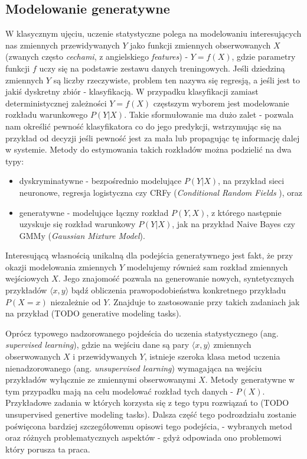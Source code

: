 \documentclass[magisterska]{pracamgr}
\begin{document}
\subsection{Modelowanie generatywne}

W klasycznym ujęciu, uczenie statystyczne polega na modelowaniu interesujących nas zmiennych przewidywanych $Y$ jako funkcji zmiennych obserwowanych $X$ (zwanych często \textit{cechami}, z angielskiego \textit{features}) - $Y = f(X)$, gdzie parametry funkcji $f$ uczy się na podstawie zestawu danych treningowych. Jeśli dziedziną zmiennych $Y$ są liczby rzeczywiste, problem ten nazywa się regresją, a jeśli jest to jakiś dyskretny zbiór - klasyfikacją. W przypadku klasyfikacji zamiast deterministycznej zależności $Y = f(X)$ częstszym wyborem jest modelowanie rozkładu warunkowego $P(Y|X)$. Takie sformułowanie ma dużo zalet - pozwala nam określić pewność klasyfikatora co do jego predykcji, wstrzymując się na przykład od decyzji jeśli pewność jest za mała lub propagując tę informację dalej w systemie. Metody do estymowania takich rozkładów można podzielić na dwa typy:
\begin{itemize}
    \setlength\itemsep{0em}
    \item dyskryminatywne - bezpośrednio modelujące $P(Y|X)$, na przykład sieci neuronowe, regresja logistyczna czy CRFy (\textit{Conditional Random Fields} \cite{Lafferty2001ConditionalRF}), oraz
    \item generatywne - modelujące łączny rozkład $P(Y, X)$, z którego następnie uzyskuje się rozkład warunkowy $P(Y|X)$, jak na przykład Naive Bayes czy GMMy (\textit{Gaussian Mixture Model}).
\end{itemize}
Interesującą własnością unikalną dla podejścia generatywnego jest fakt, że przy okazji modelowania zmiennych $Y$ modelujemy również sam rozkład zmiennych wejściowych $X$. Jego znajomość pozwala na generowanie nowych, syntetycznych przykładów $\langle x, y \rangle$ bądź obliczenia prawopodobieństwa konkretnego przykładu $P(X = x)$ niezależnie od $Y$. Znajduje to zastosowanie przy takich zadaniach jak na przykład (TODO generative modeling tasks).

Oprócz typowego nadzorowanego pojdeścia do uczenia statystycznego (ang. \textit{supervised learning}), gdzie na wejściu dane są pary $\langle x, y \rangle$ zmiennych obserwowanych $X$ i przewidywanych $Y$, istnieje szeroka klasa metod uczenia nienadzorowanego (ang. \textit{unsupervised learning}) wymagająca na wejściu przykładów wyłącznie ze zmiennymi obserwowanymi $X$. Metody generatywne w tym przypadku mają na celu modelować rozkład tych danych - $P(X)$. Przykładowe zadania w których korzysta się z tego typu rozwiązań to (TODO unsupervised genertive modeling tasks). Dalsza część tego podrozdziału zostanie poświęcona bardziej szczegółowemu opisowi tego podejścia, - wybranych metod oraz różnych problematycznych aspektów - gdyż odpowiada ono problemowi który porusza ta praca.
\end{document}
